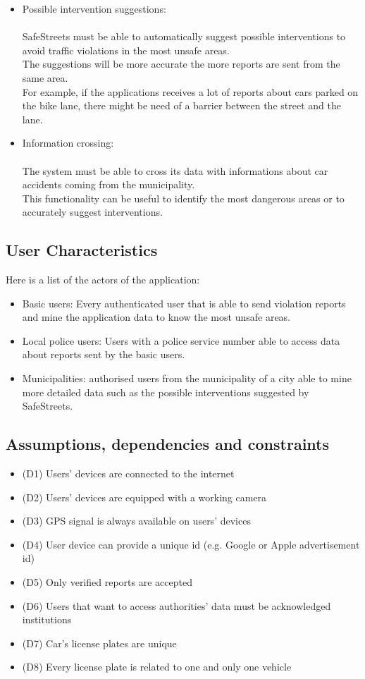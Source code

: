 \begin{itemize}
	\item Possible intervention suggestions: \\ \\
	SafeStreets must be able to automatically suggest possible interventions to avoid traffic violations in the most unsafe areas. \\
	The suggestions will be more accurate the more reports are sent from the same area. \\
	For example, if the applications receives a lot of reports about cars parked on the bike lane, there might be need of a barrier between the street and the lane.
	
	\item Information crossing: \\ \\
	The system must be able to cross its data with informations about car accidents coming from the municipality. \\
	This functionality can be useful to identify the most dangerous areas or to accurately suggest interventions.  
\end{itemize}

\subsection{User Characteristics}
Here is a list of the actors of the application: 
\begin{itemize}
	\item Basic users: Every authenticated user that is able to send violation reports and mine the application data to know the most unsafe areas. 
	\item Local police users: Users with a police service number able to access data about reports sent by the basic users. 
	\item Municipalities: authorised users from the municipality of a city able to mine more detailed data such as the possible interventions suggested by SafeStreets. 
\end{itemize}

\subsection{Assumptions, dependencies and constraints }
\begin{itemize}
	\item (D1) Users’ devices are connected to the internet 
	\item (D2) Users’ devices are equipped with a working camera 
	\item (D3) GPS signal is always available on users’ devices 
	\item (D4) User device can provide a unique id (e.g. Google or Apple advertisement id)
	\item (D5) Only verified reports are accepted 
	\item (D6) Users that want to access authorities’ data must be acknowledged institutions 
	\item (D7) Car’s license plates are unique 
	\item (D8) Every license plate is related to one and only one vehicle
\end{itemize}
 